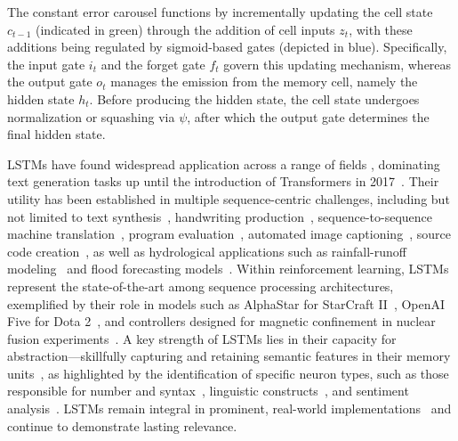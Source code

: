The constant error carousel functions by incrementally updating the cell state $c_{t-1}$ (indicated in green) through the addition of cell inputs $z_t$, with these additions being regulated by sigmoid-based gates (depicted in blue). Specifically, the input gate $i_t$ and the forget gate $f_t$ govern this updating mechanism, whereas the output gate $o_t$ manages the emission from the memory cell, namely the hidden state $h_t$. Before producing the hidden state, the cell state undergoes normalization or squashing via $\psi$, after which the output gate determines the final hidden state.

LSTMs have found widespread application across a range of fields \citep{Hochreiter:01,Hochreiter:07,Schmidhuber:15}, dominating text generation tasks up until the introduction of Transformers in 2017~\citep{Vaswani:17}. Their utility has been established in multiple sequence-centric challenges, including but not limited to text synthesis~\citep{Graves:13,Karpathy:15blog}, handwriting production~\citep{Graves:13}, sequence-to-sequence machine translation~\citep{Sutskever:14nips}, program evaluation~\citep{Zaremba:14arxiv}, automated image captioning~\citep{Karpathy:15,Hossain:19}, source code creation~\citep{Karpathy:15blog}, as well as hydrological applications such as rainfall-runoff modeling~\citep{Kratzert:18,Kratzert:19} and flood forecasting models~\citep{Nearing:24}. Within reinforcement learning, LSTMs represent the state-of-the-art among sequence processing architectures, exemplified by their role in models such as AlphaStar for StarCraft II~\citep{Vinyals:17short}, OpenAI Five for Dota 2~\citep{OpenAI:19}, and controllers designed for magnetic confinement in nuclear fusion experiments~\citep{Degrave:22short}. A key strength of LSTMs lies in their capacity for abstraction—skillfully capturing and retaining semantic features in their memory units~\citep{Karpathy:15blog}, as highlighted by the identification of specific neuron types, such as those responsible for number and syntax~\citep{Lakretz:19}, linguistic constructs~\citep{Bau:19}, and sentiment analysis~\citep{Radford:17arxiv}. LSTMs remain integral in prominent, real-world implementations~\citep{Degrave:22short,Nearing:24} and continue to demonstrate lasting relevance.

